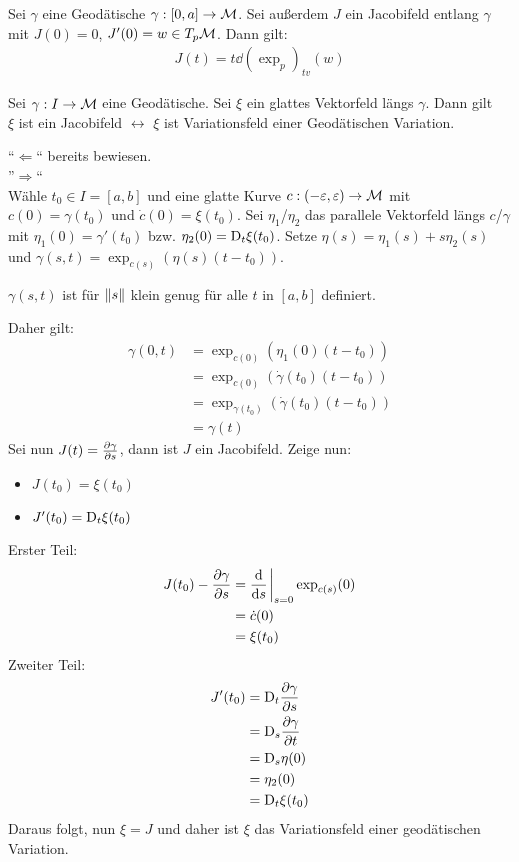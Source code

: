 \begin{lem}
    Sei $\gamma$ eine Geodätische $\gamma : [0,a]\to\mathcal{M}$.
    Sei außerdem $J$ ein Jacobifeld entlang $\gamma$ mit 
    $J(0)=0$, $J'(0)=w \in T_p\mathcal{M}$.
    Dann gilt:
    \begin{align*}
    J(t) = t \dd (\exp_p)_{tv} (w)
    \end{align*}
\end{lem}

\begin{satz}
    Sei $\gamma : I \to \mathcal{M}$ eine Geodätische.
    Sei $\xi$ ein glattes Vektorfeld längs $\gamma$.
    Dann gilt\\
    $\xi$ ist ein Jacobifeld $\leftrightarrow$ $\xi$ ist Variationsfeld einer Geodätischen Variation.
\end{satz}


\begin{bew}
``$\Leftarrow$`` bereits bewiesen.\\
''$\Rightarrow$``\\
Wähle $t_0\in I = [a, b]$ und eine glatte Kurve $c : (-\varepsilon, \varepsilon) \to \mathcal{M}$
mit $c(0) = \gamma(t_0)$ und $\dot{c}(0)=\xi (t_0)$.
Sei $\eta_1$/$\eta_2$  das parallele Vektorfeld längs $c$/$\gamma$ mit $\eta_1 (0) = \gamma' (t_0)$
bzw. $\eta_2(0)=\mathrm{D}_t \xi (t_0)$.
Setze $\eta (s) = \eta_1 (s) + s \eta_2 (s)$ und
$\gamma (s,t) = \exp_{c(s)} (\eta (s) (t-t_0))$.
\begin{bem}
    $\gamma (s,t)$ ist für $\norm {s}$ klein genug für alle $t$ in $[a, b]$ definiert.
\end{bem}
Daher gilt:
\begin{align*}
\gamma (0,t) &= \exp_{c(0)} (\eta_1(0) (t-t_0))\\
&=\exp_{c(0)} (\dot{\gamma}(t_0) (t-t_0))\\
&=\exp_{\gamma(t_0)} (\dot{\gamma}(t_0) (t-t_0)) \\ 
&= \gamma(t)
\end{align*}
Sei nun $J(t) = \pdv{\gamma}{s}(0,t)$, dann ist $J$ ein Jacobifeld.
Zeige nun:
\begin{itemize}
    \item $J(t_0) = \xi (t_0)$
    \item $J'(t_0) = \mathrm{D}_t \xi (t_0)$
\end{itemize}
Erster Teil:
\begin{align*}
    J(t_0 ) - \pdv{\gamma}{s}(0,t_0) &= \dv{s}\eval_{s=0} \exp_{c(s)} (0)\\
    &= \dot{c}(0)\\
    &= \xi (t_0)
\end{align*}
Zweiter Teil:
\begin{align*}
J'(t_0) &= \mathrm{D}_t \pdv{\gamma}{s}(0,t_0)\\
&= \mathrm{D}_s \pdv{\gamma}{t}(0,t_0)\\
&= \mathrm{D}_s \eta(0)\\
&= \eta_2(0)\\
&= \mathrm{D}_t \xi (t_0)
\end{align*}
Daraus folgt, nun $\xi = J$ und daher ist $\xi$ das Variationsfeld einer geodätischen Variation.
\end{bew}

